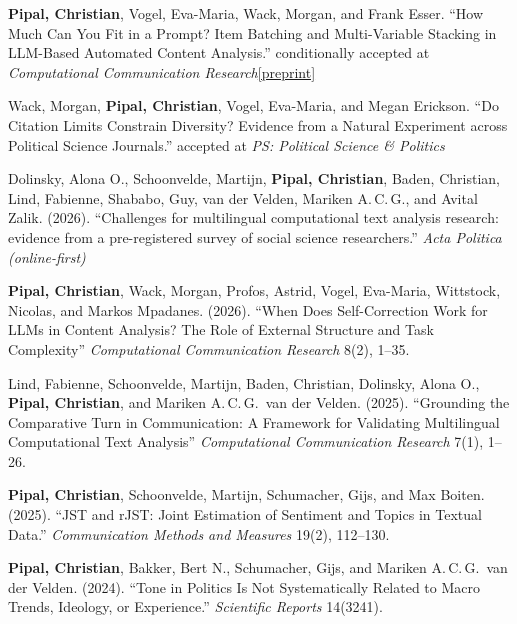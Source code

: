 \documentclass[11pt,a4paper]{article}
\newcommand{\preprint}[1]{\space\href{#1}{[preprint]}}
\begin{document}
\begin{enumerate}[leftmargin=2em, label={[\arabic*]}]

\item \textbf{Pipal, Christian}, Vogel, Eva-Maria, Wack, Morgan, and Frank Esser. ``How Much Can You Fit in a Prompt? Item Batching and Multi-Variable Stacking in LLM-Based Automated Content Analysis.'' conditionally accepted at \textit{Computational Communication Research}\preprint{https://doi.org/10.31235/osf.io/bxtsf_v1}

\item Wack, Morgan, \textbf{Pipal, Christian}, Vogel, Eva-Maria, and Megan Erickson. ``Do Citation Limits Constrain Diversity? Evidence from a Natural Experiment across Political Science Journals.'' accepted at \textit{PS: Political Science \& Politics}

\item Dolinsky, Alona O., Schoonvelde, Martijn, \textbf{Pipal, Christian}, Baden, Christian, Lind, Fabienne, Shababo, Guy, van der Velden, Mariken A.\,C.\,G., and Avital Zalik. (2026). ``Challenges for multilingual computational text analysis research: evidence from a pre-registered survey of social science researchers.'' \textit{Acta Politica (online-first)} 

\item \textbf{Pipal, Christian}, Wack, Morgan, Profos, Astrid, Vogel, Eva-Maria, Wittstock, Nicolas, and Markos Mpadanes. (2026). ``When Does Self-Correction Work for LLMs in Content Analysis? The Role of External Structure and Task Complexity'' \textit{Computational Communication Research} 8(2), 1--35.

\item Lind, Fabienne, Schoonvelde, Martijn, Baden, Christian, Dolinsky, Alona O., \textbf{Pipal, Christian}, and Mariken A.\,C.\,G.\ van der Velden. (2025). ``Grounding the Comparative Turn in Communication: A Framework for Validating Multilingual Computational Text Analysis'' \textit{Computational Communication Research} 7(1), 1--26.

\item \textbf{Pipal, Christian}, Schoonvelde, Martijn, Schumacher, Gijs, and Max Boiten. (2025). ``JST and rJST: Joint Estimation of Sentiment and Topics in Textual Data.'' \textit{Communication Methods and Measures} 19(2), 112--130.

\item \textbf{Pipal, Christian}, Bakker, Bert N., Schumacher, Gijs, and Mariken A.\,C.\,G.\ van der Velden. (2024). ``Tone in Politics Is Not Systematically Related to Macro Trends, Ideology, or Experience.'' \textit{Scientific Reports} 14(3241).


\end{enumerate}
\end{document}
